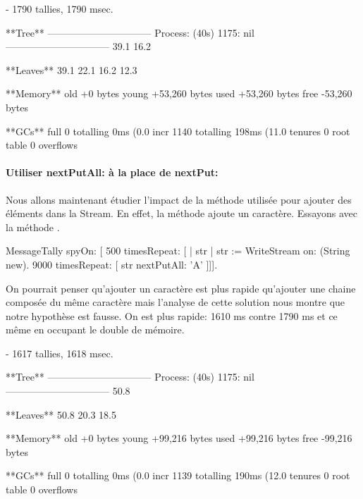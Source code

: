 \documentclass[a4paper,10pt,twoside]{book}
\begin{document}

\begin{code}{}
 - 1790 tallies, 1790 msec.

**Tree**
--------------------------------
Process: (40s)  1175: nil
--------------------------------
39.1%
16.2%

**Leaves**
39.1%
22.1%
16.2%
12.3%

**Memory**
	old			+0 bytes
	young		+53,260 bytes
	used		+53,260 bytes
	free		-53,260 bytes

**GCs**
	full			0 totalling 0ms (0.0%
	incr		1140 totalling 198ms (11.0%
	tenures		0
	root table	0 overflows
\end{code}

\paragraph{Utiliser nextPutAll: \`a la place de nextPut:}
Nous allons maintenant \'etudier l'impact de la m\'ethode utilis\'ee
pour ajouter des \'el\'ements dans la Stream. En effet, la m\'ethode
 ajoute un caract\`ere. Essayons avec la m\'ethode
.

\begin{code}{}
MessageTally spyOn: 
    [ 500 timesRepeat: [
                    | str |  
                    str := WriteStream on: (String new). 
                    9000 timesRepeat: [ str nextPutAll: 'A' ]]].
\end{code}

On pourrait penser qu'ajouter un
caract\`ere est plus rapide qu'ajouter une chaine compos\'ee du m\^eme 
caract\`ere mais l'analyse de cette solution nous montre que notre
hypoth\`ese est fausse. On est plus rapide: 1610 ms contre 1790 ms
et ce m\^eme en occupant le double de m\'emoire. 

\begin{code}{}
 - 1617 tallies, 1618 msec.

**Tree**
--------------------------------
Process: (40s)  1175: nil
--------------------------------
50.8%

**Leaves**
50.8%
20.3%
18.5%

**Memory**
	old			+0 bytes
	young		+99,216 bytes
	used		+99,216 bytes
	free		-99,216 bytes

**GCs**
	full			0 totalling 0ms (0.0%
	incr		1139 totalling 190ms (12.0%
	tenures		0
	root table	0 overflows
\end{code}
\end{document}
